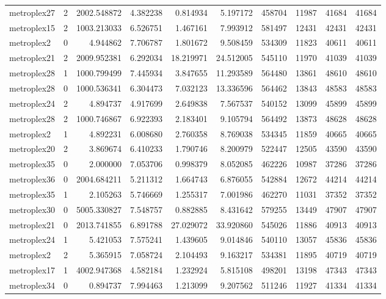\begin{longtable}{|l|r|r|r|r|r|r|r|r|r|}
metroplex27 & 2 & 2002.548872 & 4.382238 & 0.814934 & 5.197172 & 458704 & 11987 & 41684 & 41684 \\
metroplex15 & 2 & 1003.213033 & 6.526751 & 1.467161 & 7.993912 & 581497 & 12431 & 42431 & 42431 \\
metroplex2 & 0 & 4.944862 & 7.706787 & 1.801672 & 9.508459 & 534309 & 11823 & 40611 & 40611 \\
metroplex21 & 2 & 2009.952381 & 6.292034 & 18.219971 & 24.512005 & 545110 & 11970 & 41039 & 41039 \\
metroplex28 & 1 & 1000.799499 & 7.445934 & 3.847655 & 11.293589 & 564480 & 13861 & 48610 & 48610 \\
metroplex28 & 0 & 1000.536341 & 6.304473 & 7.032123 & 13.336596 & 564462 & 13843 & 48583 & 48583 \\
metroplex24 & 2 & 4.894737 & 4.917699 & 2.649838 & 7.567537 & 540152 & 13099 & 45899 & 45899 \\
metroplex28 & 2 & 1000.746867 & 6.922393 & 2.183401 & 9.105794 & 564492 & 13873 & 48628 & 48628 \\
metroplex2 & 1 & 4.892231 & 6.008680 & 2.760358 & 8.769038 & 534345 & 11859 & 40665 & 40665 \\
metroplex20 & 2 & 3.869674 & 6.410233 & 1.790746 & 8.200979 & 522447 & 12505 & 43590 & 43590 \\
metroplex35 & 0 & 2.000000 & 7.053706 & 0.998379 & 8.052085 & 462226 & 10987 & 37286 & 37286 \\
metroplex36 & 0 & 2004.684211 & 5.211312 & 1.664743 & 6.876055 & 542884 & 12672 & 44214 & 44214 \\
metroplex35 & 1 & 2.105263 & 5.746669 & 1.255317 & 7.001986 & 462270 & 11031 & 37352 & 37352 \\
metroplex30 & 0 & 5005.330827 & 7.548757 & 0.882885 & 8.431642 & 579255 & 13449 & 47907 & 47907 \\
metroplex21 & 0 & 2013.741855 & 6.891788 & 27.029072 & 33.920860 & 545026 & 11886 & 40913 & 40913 \\
metroplex24 & 1 & 5.421053 & 7.575241 & 1.439605 & 9.014846 & 540110 & 13057 & 45836 & 45836 \\
metroplex2 & 2 & 5.365915 & 7.058724 & 2.104493 & 9.163217 & 534381 & 11895 & 40719 & 40719 \\
metroplex17 & 1 & 4002.947368 & 4.582184 & 1.232924 & 5.815108 & 498201 & 13198 & 47343 & 47343 \\
metroplex34 & 0 & 0.894737 & 7.994463 & 1.213099 & 9.207562 & 511246 & 11927 & 41334 & 41334 \\

\end{longtable}
